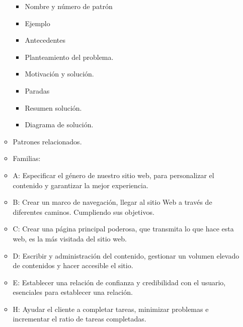 \documentclass[12pt, twoside, openright]{report} %
\begin{document}
\begin{itemize}
\begin{itemize}
		            \begin{itemize}
			            \item Nombre y número de patrón

			            \item Ejemplo

			            \item Antecedentes

			            \item Planteamiento del problema.

			            \item Motivación y solución.

			            \item Paradas

			            \item Resumen solución.

			            \item Diagrama de solución.
		            \end{itemize}

		      \item Patrones relacionados.

		      \item Familias:

		      \item A: Especificar el género de nuestro sitio web, para
		            personalizar el contenido y garantizar la mejor experiencia.

		      \item B: Crear un marco de navegación, llegar al sitio Web a través
		            de diferentes caminos. Cumpliendo sus objetivos.

		      \item C: Crear una página principal poderosa, que transmita lo que
		            hace esta web, es la más visitada del sitio web.

		      \item D: Escribir y administración del contenido, gestionar un
		            volumen elevado de contenidos y hacer accesible el sitio.

		      \item E: Establecer una relación de confianza y credibilidad con el
		            usuario, esenciales para establecer una relación.

		      \item H: Ayudar el cliente a completar tareas, minimizar problemas e
		            incrementar el ratio de tareas completadas.


\end{itemize}
\end{itemize}
\end{document}
